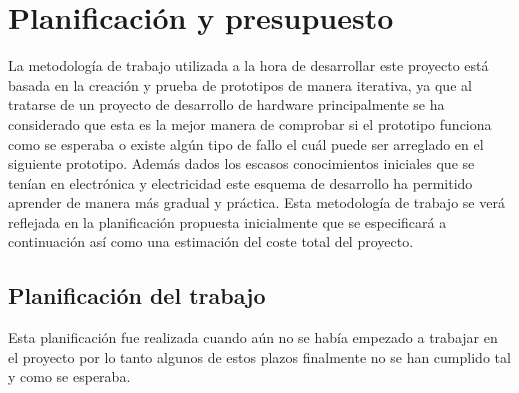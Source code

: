 \chapter{Planificación y presupuesto}

La metodología de trabajo utilizada a la hora de desarrollar este proyecto está basada en la creación y prueba de prototipos de manera iterativa, ya que al tratarse de un proyecto de desarrollo de hardware principalmente se ha considerado que esta es la mejor manera de comprobar si el prototipo funciona como se esperaba o existe algún tipo de fallo el cuál puede ser arreglado en el siguiente prototipo. Además dados los escasos conocimientos iniciales que se tenían en electrónica y electricidad este esquema de desarrollo ha permitido aprender de manera más gradual y práctica. Esta metodología de trabajo se verá reflejada en la planificación propuesta inicialmente que se especificará a continuación así como una estimación del coste total del proyecto.

\section{Planificación del trabajo}
Esta planificación fue realizada cuando aún no se había empezado a trabajar en el proyecto por lo tanto algunos de estos plazos finalmente no se han cumplido tal y como se esperaba.

